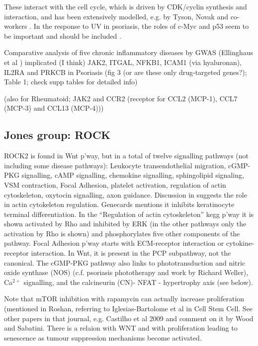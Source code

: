 \documentclass[a4paper,10pt]{report}
\begin{document}
These interact with the cell cycle, which is driven by CDK/cyclin synthesis and interaction, and has been extensively modelled, e.g. by Tyson, Novak and co-workers \cite{tyson1991modeling}. In the response to UV in psoriasis, the roles of c-Myc and p53 seem to be important and should be included \cite{freije2014inactivation,gandarillas2000normal}.

Comparative analysis of five chronic inflammatory diseases by GWAS (Ellinghaus et al \cite{ellinghaus2016analysis})  implicated (I think) JAK2, ITGAL, NFKB1, ICAM1 (via hyaluronan), IL2RA and PRKCB in Psoriasis (fig 3 (or are these only drug-targeted genes?); Table 1; check supp tables for detailed info) 

(also for Rheumatoid; JAK2 and CCR2 (receptor for CCL2 (MCP-1), CCL7 (MCP-3) and CCL13 (MCP-4)))


\subsection{Jones group: ROCK}
ROCK2 is found in Wnt p'way, but in a total of twelve signalling pathways (not including some disease pathways): Leukocyte transendothelial migration, cGMP-PKG signalling, cAMP signalling, chemokine signalling, sphingolipid signaling, VSM contraction, Focal Adhesion, platelet activation, regulation of actin cytoskeleton, oxytocin signalling, axon guidance. Discussion in \cite{roshan2016human} suggests the role in actin cytokeleton regulation. Genecards mentions it inhibits keratinocyte terminal differentiation. In the ``Regulation of actin cytoskeleton'' kegg p'way it is shown activated by Rho and inhibited by ERK (in the other pathways only the activation by Rho is shown) and phosphorylates five other components of the pathway. Focal Adhesion p'way starts with ECM-receptor interaction or cytokine-receptor interaction. In Wnt, it is present in the PCP subpathway, not the canonical. The cGMP-PKG pathway also links to phototransduction and nitric oxide synthase (NOS) (c.f. psoriasis phototherapy and work by Richard Weller), Ca$^{2+}$ signalling, and the calcineurin (CN)- NFAT - hypertrophy axis (see below). 

Note that mTOR inhibition with rapamycin can actually increase proliferation (mentioned in Roshan, referring to Iglesias-Bartolome et al in Cell Stem Cell. See other papers in that journal, e.g. Castilho et al 2009 and comment on it by Wood and Sabatini. There is a relaion with WNT and with proliferation leading to senescence as tumour suppression mechanisms become activated. 
\end{document}
